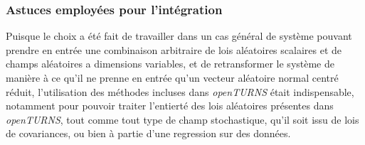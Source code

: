 \documentclass[a4paper,10pt]{article}
\begin{document}
\subsubsection{Astuces employées pour l'intégration}
Puisque le choix a été fait de travailler dans un cas général de système pouvant prendre en entrée une combinaison arbitraire de lois aléatoires scalaires et de champs aléatoires a dimensions variables, et de retransformer le système de manière à ce qu'il ne prenne en entrée qu'un vecteur aléatoire normal centré réduit, l'utilisation des méthodes incluses dans \textit{openTURNS} était indispensable, notamment pour pouvoir traiter l'entierté des lois aléatoires présentes dans \textit{openTURNS}, tout comme tout type de champ stochastique, qu'il soit issu de lois de covariances, ou bien à partie d'une regression sur des données.
\end{document}
